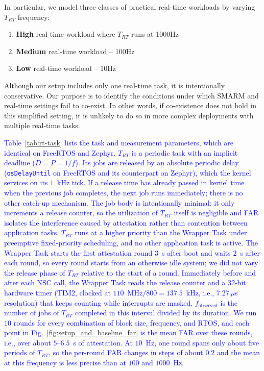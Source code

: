 \documentclass[journal]{IEEEtran}
\newcommand\ben[1]{\textcolor{blue}{#1}}
\begin{document}
In particular, we model three classes of practical real-time workloads by varying $T_{RT}$ frequency:
\begin{enumerate}
    \item \textbf{High} real-time workload where $T_{RT}$ runs at 1000Hz
    \item \textbf{Medium} real-time workload -- 100Hz
    \item \textbf{Low} real-time workload -- 10Hz
\end{enumerate}

Although our setup includes only one real-time task, it is intentionally conservative.
Our purpose is to identify the conditions under which SMARM and real-time settings fail to co-exist.
In other words, if co-existence does not hold in this simplified setting, it is unlikely to do so in more complex deployments with multiple real-time tasks.


\ben{Table~\ref{tab:rt-task} lists the task and measurement parameters, which are identical on FreeRTOS and Zephyr.
$T_{RT}$ is a periodic task with an implicit deadline ($D = P = 1/f$).
Its jobs are released by an absolute periodic delay (\texttt{osDelayUntil} on FreeRTOS and its counterpart on Zephyr), which the kernel services on its $1$~kHz tick.
If a release time has already passed in kernel time when the previous job completes, the next job runs immediately; there is no other catch-up mechanism.
The job body is intentionally minimal: it only increments a release counter, so the utilization of $T_{RT}$ itself is negligible and FAR isolates the interference caused by attestation rather than contention between application tasks.
$T_{RT}$ runs at a higher priority than the Wrapper Task under preemptive fixed-priority scheduling, and no other application task is active.
The Wrapper Task starts the first attestation round $3$~s after boot and waits $2$~s after each round, so every round starts from an otherwise idle system; we did not vary the release phase of $T_{RT}$ relative to the start of a round.
Immediately before and after each NSC call, the Wrapper Task reads the release counter and a $32$-bit hardware timer (TIM2, clocked at $110$~MHz$/800 = 137.5$~kHz, i.e., $7.27~\mu$s resolution) that keeps counting while interrupts are masked.
$f_{\text{observed}}$ is the number of jobs of $T_{RT}$ completed in this interval divided by its duration.
We run $10$ rounds for every combination of block size, frequency, and RTOS, and each point in Fig.~\ref{fig:setup_and_baseline_far} is the mean FAR over these rounds, i.e., over about $5$--$6.5$~s of attestation.
At $10$~Hz, one round spans only about five periods of $T_{RT}$, so the per-round FAR changes in steps of about $0.2$ and the mean at this frequency is less precise than at $100$ and $1000$~Hz.}
\end{document}
